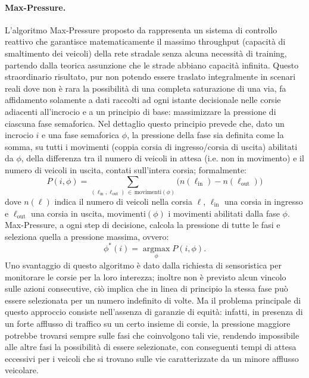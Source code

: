 \paragraph{Max-Pressure.}
L'algoritmo Max-Pressure proposto da \citep{varaiya2013maxpressure} rappresenta un sistema di controllo reattivo che garantisce matematicamente
il massimo throughput (capacità di smaltimento dei veicoli) della rete stradale senza alcuna necessità di training, partendo dalla teorica assunzione che le strade abbiano capacità infinita.
Questo straordinario risultato, pur non potendo essere traslato integralmente in scenari reali dove non è rara la possibilità di una completa
saturazione di una via, fa affidamento solamente a dati raccolti ad ogni istante decisionale nelle corsie adiacenti all'incrocio e a un principio di base: massimizzare la pressione di ciascuna fase semaforica.
Nel dettaglio questo principio prevede che, dato un incrocio $i$ e una fase semaforica $\phi$, la pressione della fase sia definita come la somma,
su tutti i movimenti (coppia corsia di ingresso/corsia di uscita) abilitati da $\phi$, della differenza tra il numero di veicoli in attesa (i.e. non in movimento) e il numero di veicoli in uscita,
contati sull'intera corsia; formalmente:
\begin{equation}
  P(i,\phi) = \sum_{(\ell_{\mathrm{in}}, \ell_{\mathrm{out}}) \,\in\, \mathrm{movimenti}(\phi)} \Big( n(\ell_{\mathrm{in}}) - n(\ell_{\mathrm{out}}) \Big)
  \label{eq:maxpressure}
\end{equation}
dove $n(\ell)$ indica il numero di veicoli nella corsia $\ell$, $\ell_{\mathrm{in}}$ una corsia in ingresso e $\ell_{\mathrm{out}}$ una corsia in uscita,
$\mathrm{movimenti}(\phi)$ i movimenti abilitati dalla fase $\phi$.
Max-Pressure, a ogni step di decisione, calcola la pressione di tutte le fasi e seleziona quella a pressione massima, ovvero:
\[ \phi^*(i) = \operatorname*{argmax}_\phi P(i,\phi) .\]
Uno svantaggio di questo algoritmo è dato dalla richiesta di sensoristica per monitorare le corsie per la loro interezza;
inoltre non è previsto alcun vincolo sulle azioni consecutive, ciò implica che in linea di principio la stessa fase può essere selezionata per un numero indefinito
di volte.
Ma il problema principale di questo approccio consiste nell'assenza di garanzie di equità: infatti, in presenza di un forte afflusso di traffico su un certo insieme di corsie,
la pressione maggiore potrebbe trovarsi sempre sulle fasi che coinvolgono tali vie, rendendo impossibile alle altre fasi la possibilità di essere selezionate,
con conseguenti tempi di attesa eccessivi per i veicoli che si trovano sulle vie caratterizzate da un minore afflusso veicolare.





